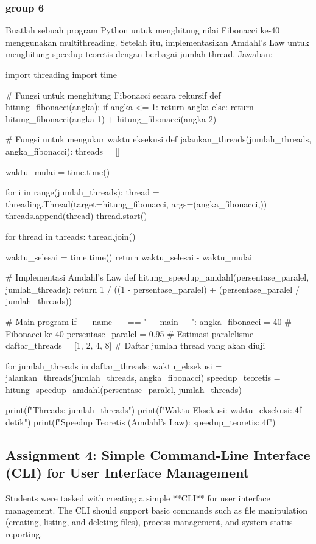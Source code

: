 \documentclass[12pt]{article}
\begin{document}
\subsubsection{group 6}
Buatlah sebuah program Python untuk menghitung nilai Fibonacci ke-40 menggunakan multithreading. Setelah itu, implementasikan Amdahl's Law untuk menghitung speedup teoretis dengan berbagai jumlah thread.
Jawaban:

\begin{python}
import threading
import time

# Fungsi untuk menghitung Fibonacci secara rekursif
def hitung_fibonacci(angka):
    if angka <= 1:
        return angka
    else:
        return hitung_fibonacci(angka-1) + hitung_fibonacci(angka-2)

# Fungsi untuk mengukur waktu eksekusi
def jalankan_threads(jumlah_threads, angka_fibonacci):
    threads = []
    
    waktu_mulai = time.time()
    
    for i in range(jumlah_threads):
        thread = threading.Thread(target=hitung_fibonacci, args=(angka_fibonacci,))
        threads.append(thread)
        thread.start()

    for thread in threads:
        thread.join()
    
    waktu_selesai = time.time()
    return waktu_selesai - waktu_mulai

# Implementasi Amdahl's Law
def hitung_speedup_amdahl(persentase_paralel, jumlah_threads):
    return 1 / ((1 - persentase_paralel) + (persentase_paralel / jumlah_threads))

# Main program
if __name__ == "__main__":
    angka_fibonacci = 40  # Fibonacci ke-40
    persentase_paralel = 0.95  # Estimasi paralelisme
    daftar_threads = [1, 2, 4, 8]  # Daftar jumlah thread yang akan diuji
    
    for jumlah_threads in daftar_threads:
        waktu_eksekusi = jalankan_threads(jumlah_threads, angka_fibonacci)
        speedup_teoretis = hitung_speedup_amdahl(persentase_paralel, jumlah_threads)
        
        print(f"\nJumlah Threads: {jumlah_threads}")
        print(f"Waktu Eksekusi: {waktu_eksekusi:.4f} detik")
        print(f"Speedup Teoretis (Amdahl's Law): {speedup_teoretis:.4f}")
\end{python}

\subsection{Assignment 4: Simple Command-Line Interface (CLI) for User Interface Management}
Students were tasked with creating a simple **CLI** for user interface management. The CLI should support basic commands such as file manipulation (creating, listing, and deleting files), process management, and system status reporting.
\end{document}
